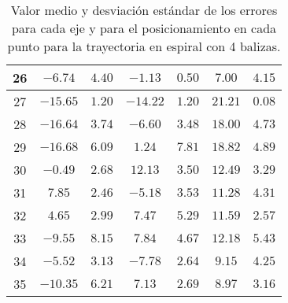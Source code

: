 \begin{table}[H]
\begin{tabular}{|c|c|c|c|c|c|c|}
                        26  &   $-6.74$  &  $4.40$   &  $-1.13$   &  $0.50$   &  $7.00$   & $4.15$  \\ \hline
                        27  &   $-15.65$ &  $1.20$   &  $-14.22$  &  $1.20$   &  $21.21$  & $0.08$  \\ \hline
                        28  &   $-16.64$ &  $3.74$   &  $-6.60$   &  $3.48$   &  $18.00$  & $4.73$  \\ \hline
                        29  &   $-16.68$ &  $6.09$   &  $1.24$    &  $7.81$   &  $18.82$  & $4.89$  \\ \hline
                        30  &   $-0.49$  &  $2.68$   &  $12.13$   &  $3.50$   &  $12.49$  & $3.29$  \\ \hline
                        31  &   $7.85$   &  $2.46$   &  $-5.18$   &  $3.53$   &  $11.28$  & $4.31$  \\ \hline
                        32  &   $4.65$   &  $2.99$   &  $7.47$    &  $5.29$   &  $11.59$  & $2.57$  \\ \hline
                        33  &   $-9.55$  &  $8.15$   &  $7.84$    &  $4.67$   &  $12.18$  & $5.43$  \\ \hline
                        34  &   $-5.52$  &  $3.13$   &  $-7.78$   &  $2.64$   &  $9.15$   & $4.25$  \\ \hline
                        35  &   $-10.35$ &  $6.21$   &  $7.13$    &  $2.69$   &  $8.97$   & $3.16$  \\ \hline
        \end{tabular}
    \caption{Valor medio y desviación estándar de los errores para cada eje y para el posicionamiento en cada punto para la trayectoria en espiral con 4 balizas.}
    \label{tab:media_lab_4_espiral}
\end{table}

\newpage
